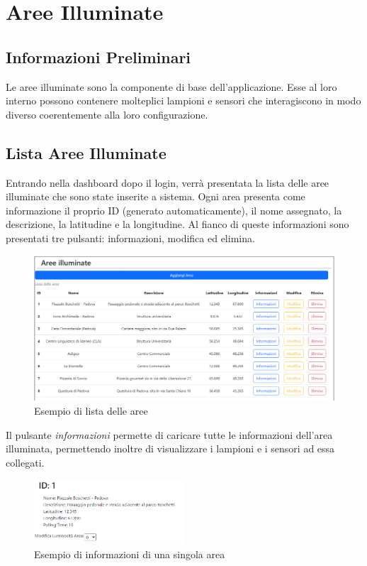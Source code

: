 \documentclass[a4paper, 12pt]{article}
\begin{document}
\newpage
\section{Aree Illuminate}
\subsection{Informazioni Preliminari}
Le aree illuminate sono la componente di base dell'applicazione. Esse al loro interno possono contenere molteplici lampioni e sensori che interagiscono in modo diverso coerentemente alla loro configurazione.
\subsection{Lista Aree Illuminate}
Entrando nella dashboard dopo il login, verrà presentata la lista delle aree illuminate che sono state inserite a sistema. Ogni area presenta come informazione il proprio ID (generato automaticamente), il nome assegnato, la descrizione, la latitudine e la longitudine. Al fianco di queste informazioni sono presentati tre pulsanti: informazioni, modifica ed elimina. \\
\begin{figure}[H]
\centering
\includegraphics[width=\textwidth]{ListaAree}
\caption{Esempio di lista delle aree}
\end{figure}
Il pulsante \textit{informazioni} permette di caricare tutte le informazioni dell'area illuminata, permettendo inoltre di visualizzare i lampioni e i sensori ad essa collegati.\\
\begin{figure}[H]
\centering
\includegraphics[width=0.5\textwidth]{InfoArea}
\caption{Esempio di informazioni di una singola area}
\end{figure}
\end{document}
